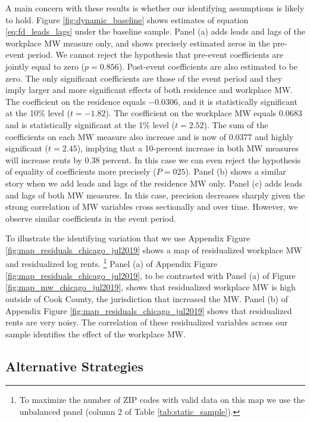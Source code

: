 A main concern with these results is whether our identifying assumptions is 
likely to hold.
Figure \ref{fig:dynamic_baseline} shows estimates of equation 
\eqref{eq:fd_leads_lags} under the baseline sample.
Panel (a) adds leads and lags of the workplace MW measure only, and shows
precisely estimated zeros in the pre-event period.
We cannot reject the hypothesis that pre-event coefficients are jointly equal
to zero ($p = 0.856$).
Post-event coefficients are also estimated to be zero.
The only significant coefficients are those of the event period and they imply 
larger and more significant effects of both residence and workplace MW.
The coefficient on the residence equals $-0.0306$, and it is 
statistically significant at the 10\% level ($t=-1.82$).
The coefficient on the workplace MW equals $0.0683$ and is 
statistically significant at the 1\% level ($t=2.52$).
The sum of the coefficients on each MW measure also increase and is now of
$0.0377$ and highly significant ($t=2.45$), implying that a 10-percent increase 
in both MW measures will increase rents by $0.38$ percent.
In this case we can even reject the hypothesis of equality of coefficients more
precisely ($P = 025$).
Panel (b) shows a similar story when we add leads and lags of the residence MW
only.
Panel (c) adds leads and lags of both MW measures.
In this case, precision decreases sharply given the strong correlation of 
MW variables cross sectionally and over time. However, we observe similar 
coefficients in the event period.

To illustrate the identifying variation that we use 
Appendix Figure \ref{fig:map_residuals_chicago_jul2019} shows a map of 
residualized workplace MW and residualized log rents.%
\footnote{To maximize the number of ZIP codes with valid data on this map we
use the unbalanced panel (column 2 of Table \ref{tab:static_sample}).}
Panel (a) of Appendix Figure \ref{fig:map_residuals_chicago_jul2019}, to be 
contrasted with Panel (a) of Figure \ref{fig:map_mw_chicago_jul2019}, 
shows that residualized workplace MW is high outside of Cook County, the 
jurisdiction that increased the MW.
Panel (b) of Appendix Figure \ref{fig:map_residuals_chicago_jul2019} shows that 
residualized rents are very noisy.
The correlation of these residualized variables across our sample identifies
the effect of the workplace MW.

\subsection{Alternative Strategies}

